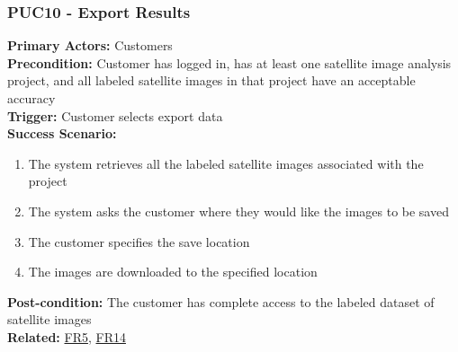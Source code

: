 \documentclass[12pt]{article}
\begin{document}
\subsubsection*{PUC10 - Export Results}
\label{sec:PUC10}
\textbf{Primary Actors:} Customers\\
\textbf{Precondition:} Customer has logged in, has at least one satellite image analysis project, and all labeled satellite images in that project have an acceptable accuracy\\
\textbf{Trigger:} Customer selects export data\\
\textbf{Success Scenario:}
\begin{enumerate}
    \item The system retrieves all the labeled satellite images associated with the project
    \item The system asks the customer where they would like the images to be saved
    \item The customer specifies the save location
    \item The images are downloaded to the specified location
\end{enumerate}
\textbf{Post-condition:} The customer has complete access to the labeled dataset of satellite images\\
\textbf{Related:} \hyperref[sec:FR5]{FR5}, \hyperref[sec:FR14]{FR14}
\end{document}
